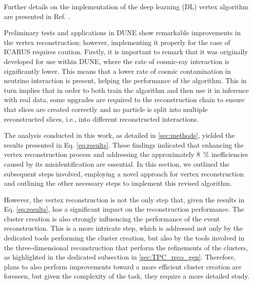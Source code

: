 Further details on the implementation of the deep learning (DL) vertex algorithm are presented in Ref. \cite{DUNE:2025wti}. 

Preliminary tests and applications in DUNE show remarkable improvements in the vertex reconstruction; however, implementing it properly for the case of ICARUS requires caution. Firstly, it is important to remark that it was originally developed for use within DUNE, where the rate of cosmic-ray interaction is significantly lower. This means that a lower rate of cosmic contamination in neutrino interaction is present, helping the performance of the algorithm. This in turn implies that in order to both train the algorithm and then use it in inference with real data, some upgrades are required to the reconstruction chain to ensure that slices are created correctly and no particle is split into multiple reconstructed slices, i.e., into different reconstructed interactions.

The analysis conducted in this work, as detailed in \autoref{sec:methods}, yielded the results presented in Eq. \eqref{eq:results}. These findings indicated that enhancing the vertex reconstruction process and addressing the approximately \SI{8}{\percent} inefficiencies caused by its misidentification are essential. In this section, we outlined the subsequent steps involved, employing a novel approach for vertex reconstruction and outlining the other necessary steps to implement this revised algorithm.

However, the vertex reconstruction is not the only step that, given the results in Eq. \eqref{eq:results}, has a significant impact on the reconstruction performance. The cluster creation is also strongly influencing the performance of the event reconstruction. This is a more intricate step, which is addressed not only by the dedicated tools performing the cluster creation, but also by the tools involved in the three-dimensional reconstruction that perform the refinements of the clusters, as highlighted in the dedicated subsection in \autoref{sec:TPC_reco_gen}. Therefore, plans to also perform improvements toward a more efficient cluster creation are foreseen, but given the complexity of the task, they require a more detailed study. 

% 

